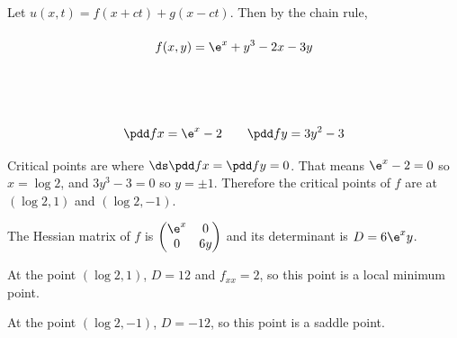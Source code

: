 \documentclass[a4paper]{article}
\begin{document}

Let $u(x, t) = f(x+ct) + g(x-ct)$. Then by the chain rule, \begin{align*}
\end{align*}



$$f(x, y) = \e^x + y^3 - 2x - 3y$$

\subsection{~}

$$\pdd fx = \e^x - 2 \qquad \pdd fy = 3y^2 - 3$$

Critical points are where $\ds \pdd fx = \pdd fy = 0$. That means $\e^x - 2 = 0$ so $x = \log 2$, and $3y^3 - 3 = 0$ so $y = \pm 1$. Therefore the critical points of $f$ are at $(\log 2, 1)$ and $(\log 2, -1)$.

The Hessian matrix of $f$ is $\begin{pmatrix} \e^x & 0\\ 0 & 6y \end{pmatrix}$ and its determinant is $D = 6 \e^x y$.

At the point $(\log 2, 1)$, $D = 12$ and $f_{xx} = 2$, so this point is a local minimum point.

At the point $(\log 2, -1)$, $D = -12$, so this point is a saddle point.

\subsection{~}
\end{document}
